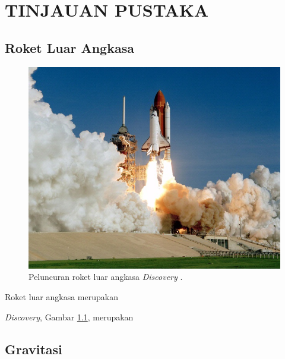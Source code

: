 \chapter{TINJAUAN PUSTAKA}
\label{chap:tinjauanpustaka}


\section{Roket Luar Angkasa}
\label{sec:roketluarangkasa}

\begin{figure}[ht]
  \centering

  \includegraphics[scale=0.35]{gambar/roketluarangkasa.jpg}

  \caption{Peluncuran roket luar angkasa \emph{Discovery} \citep{roketluarangkasa}.}
  \label{fig:roketluarangkasa}
\end{figure}

Roket luar angkasa merupakan \lipsum[1]

\emph{Discovery}, Gambar \ref{fig:roketluarangkasa}, merupakan \lipsum[2]

\section{Gravitasi}
\label{sec:gravitasi}

